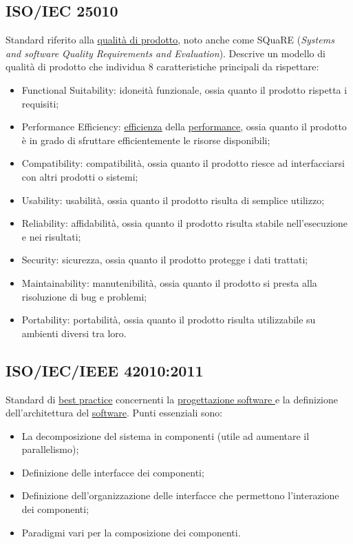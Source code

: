 	\subsection{ISO/IEC 25010}
	\label{sec:iso25010d}
	Standard riferito alla \underline{\hyperref[sec:qualitaprodotto]{qualità di prodotto}}, noto anche come SQuaRE (\emph{Systems and software Quality Requirements and Evaluation}). Descrive un modello di qualità di prodotto che individua 8 caratteristiche principali da rispettare: \begin{itemize}
	\item Functional Suitability: idoneità funzionale, ossia quanto il prodotto rispetta i requisiti;
	\item Performance Efficiency: \underline{\hyperref[sec:efficienza]{efficienza}} della \underline{\hyperref[sec:performance]{performance}}, ossia quanto il prodotto è in grado di sfruttare efficientemente le risorse disponibili;
	\item Compatibility: compatibilità, ossia quanto il prodotto riesce ad interfacciarsi con altri prodotti o sistemi;
	\item Usability: usabilità, ossia quanto il prodotto risulta di semplice utilizzo;
	\item Reliability: affidabilità, ossia quanto il prodotto risulta stabile nell'esecuzione e nei risultati;
	\item Security: sicurezza, ossia quanto il prodotto protegge i dati trattati;
	\item Maintainability: manutenibilità, ossia quanto il prodotto si presta alla risoluzione di bug e problemi;
	\item Portability: portabilità, ossia quanto il prodotto risulta utilizzabile su ambienti diversi tra loro.
	\end{itemize}

	\subsection{ISO/IEC/IEEE 42010:2011}
	\label{sec:iso12207}
	Standard di \underline{\hyperref[sec:bestpractice]{best practice}} concernenti la \underline{\hyperref[sec:progettazionesoftware]{progettazione software }} e la definizione dell'architettura del \underline{\hyperref[sec:prodottosoftware]{software}}. Punti essenziali sono:
	\begin{itemize}
	\item La decomposizione del sistema in componenti (utile ad aumentare il parallelismo);
	\item Definizione delle interfacce dei componenti;
	\item Definizione dell'organizzazione delle interfacce che permettono l'interazione dei componenti;
	\item Paradigmi vari per la composizione dei componenti.
	\end{itemize}

